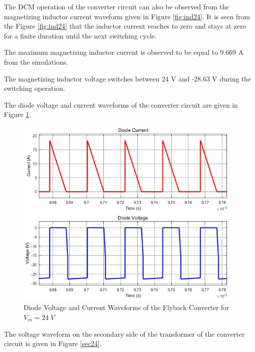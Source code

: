 The DCM operation of the converter circuit can also be observed from the magnetizing inductor current waveform given in Figure \ref{fig:ind24}. It is seen from the Figure \ref{fig:ind24} that the inductor current reaches to zero and stays at zero for a finite duration until the next switching cycle.

The maximum magnetizing inductor current is observed to be equal to 9.669 A from the simulations.

The magnetizing inductor voltage switches between 24 V and -28.63 V during the switching operation.

The diode voltage and current waveforms of the converter circuit are given in Figure \ref{fig:dio24}.

\begin{figure}[H]
\begin{center}
\includegraphics[width=1\textwidth]{diode_curr_volt_24.jpg}
\caption{Diode Voltage and Current Waveforms of the Flyback Converter for $ V_{in} = 24\;V $}
\label{fig:dio24}
\end{center}
\end{figure}

The voltage waveform on the secondary side of the transformer of the converter circuit is given in Figure \ref{sec24}.

